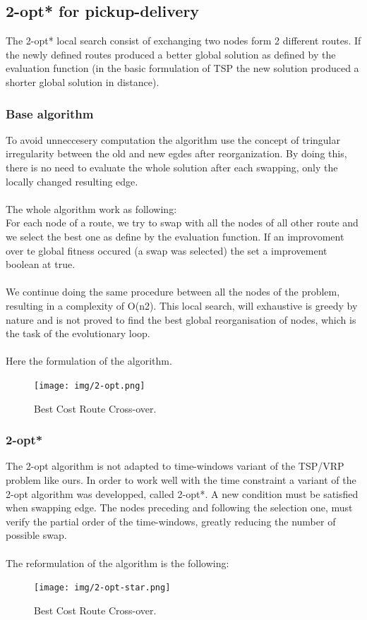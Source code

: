 \documentclass[12pt]{memoir}
\begin{document}
\subsection{2-opt* for pickup-delivery}
The 2-opt* local search consist of exchanging two nodes form 2 different routes. If the newly defined routes 
produced a better global solution as defined by the evaluation function (in the basic formulation of TSP 
the new solution produced a shorter global solution in distance).



\subsubsection{Base algorithm}
To avoid unneccesery computation the algorithm use the concept of tringular irregularity 
between the old and new egdes after reorganization. By doing this, there is no need to 
evaluate the whole solution after each swapping, only the locally changed resulting edge.\\
\\
The whole algorithm work as following:\\
For each node of a route, we try to swap with all the nodes of all other route and we 
select the best one as define by the evaluation function. If an improvoment over te global
 fitness occured (a swap was selected) the set a improvement boolean at true.\\
\\
We continue doing the same procedure between all the nodes of the problem, resulting in a
 complexity of O(n2). This local search, will exhaustive is greedy by nature and is not proved
 to find the best global reorganisation of nodes, which is the task of the evolutionary loop.\\
\\
Here the formulation of the algorithm.
\begin{figure}[htbp]
	\begin{center}
		\texttt{[image: img/2-opt.png]}
		\caption{Best Cost Route Cross-over.}
	\end{center}
\end{figure}
\subsubsection{2-opt*}
The 2-opt algorithm is not adapted to time-windows variant of the TSP/VRP problem like ours.
 In order to work well with the time constraint a variant of the 2-opt algorithm was developped,
 called 2-opt*. A new condition must be satisfied when swapping edge. The nodes preceding and 
following the selection one, must verify the partial order of the time-windows, greatly reducing
 the number of possible swap.\\
\\
The reformulation of the algorithm is the following:
\begin{figure}[htbp]
	\begin{center}
		\texttt{[image: img/2-opt-star.png]}
		\caption{Best Cost Route Cross-over.}
	\end{center}
\end{figure}
\end{document}
